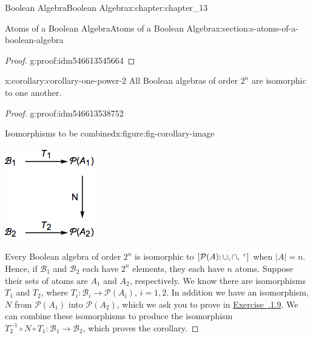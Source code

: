 \documentclass[oneside,10pt,]{book}
\newcommand{\xreffont}{\relax}
\numberwithin{equation}{section}
\begin{document}
\begin{chapterptx}{Boolean Algebra}{}{Boolean Algebra}{}{}{x:chapter:chapter_13}
\begin{sectionptx}{Atoms of a Boolean Algebra}{}{Atoms of a Boolean Algebra}{}{}{x:section:s-atoms-of-a-boolean-algebra}
\begin{proof}{}{g:proof:idm546613545664}
\end{proof}
\begin{corollary}{}{}{x:corollary:corollary-one-power-2}%
All Boolean algebras of order \(2^n\) are isomorphic to one another.%
\end{corollary}
\begin{proof}{}{g:proof:idm546613538752}
\begin{figureptx}{Isomorphisms to be combined}{x:figure:fig-corollary-image}{}%
\begin{image}{0.325}{0.35}{0.325}%
\includegraphics[width=\linewidth]{images/fig-corollary-image.png}
\end{image}%
\tcblower
\end{figureptx}%
Every Boolean algebra of order \(2^n\) is isomorphic to \([\mathcal{P}(A); \cup , \cap, \hspace{1 mm}^c ]\) when \(\lvert A \rvert= n\). Hence, if \(\mathcal{B}_1\) and \(\mathcal{B}_2\) each have \(2^n\) elements, they each have \(n\) atoms.  Suppose their sets of atoms are \(A_1\) and \(A_2\), respectively.  We know there are isomorphisms \(T_1\) and \(T_2\), where \(T_i:\mathcal{B}_i \to \mathcal{P}(A_i)\), \(i=1,2\).  In addition we have an isomorphism, \(N\) from \(\mathcal{P}(A_1)\) into \(\mathcal{P}(A_2)\), which we ask you to prove in \hyperlink{x:exercise:exercise-set-boolean-isomorphism}{Exercise~{\xreffont 13.4.1.9}}.  We can combine these isomorphisms to produce the isomorphism   \(T_{2}^{-1}\circ N \circ T_1:\mathcal{B}_1 \to \mathcal{B}_2\), which proves the corollary.%

\end{proof}
\end{sectionptx}
\end{chapterptx}
\end{document}
